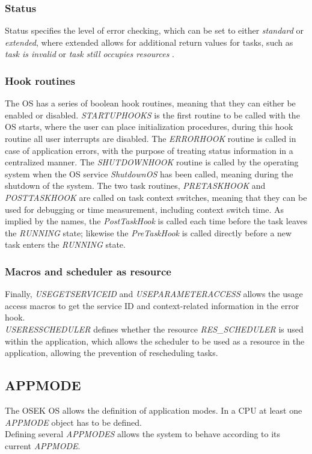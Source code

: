 \subsubsection{Status}
Status specifies the level of error checking, which can be set to either \textit{standard} or \textit{extended}, where extended allows for additional return values for tasks, such as \textit{task is invalid} or \textit{task still occupies resources} \cite{irisa223}.\\

\subsubsection*{Hook routines}
The OS has a series of boolean hook routines, meaning that they can either be enabled or disabled.
\textit{STARTUPHOOKS} is the first routine to be called with the OS starts, where the user can place initialization procedures, during this hook routine all user interrupts are disabled\cite{irisa223}.
The \textit{ERRORHOOK} routine is called in case of application errors, with the purpose of treating status information in a centralized manner.
The \textit{SHUTDOWNHOOK} routine is called by the operating system when the OS service \textit{ShutdownOS} has been called, meaning during the shutdown of the system.
The two task routines, \textit{PRETASKHOOK} and \textit{POSTTASKHOOK} are called on task context switches, meaning that they can be used for debugging or time measurement, including context switch time\cite{irisa223}.
As implied by the names, the \textit{PostTaskHook} is called each time before the task leaves the \textit{RUNNING} state; likewise the \textit{PreTaskHook} is called directly before a new task enters the \textit{RUNNING} state\cite{irisa223}.

\subsubsection*{Macros and scheduler as resource}
Finally, \textit{USEGETSERVICEID} and \textit{USEPARAMETERACCESS} allows the usage access macros to get the service ID and context-related information in the error hook.\\
\textit{USERESSCHEDULER} defines whether the resource \textit{RES\_SCHEDULER} is used within the application, which allows the scheduler to be used as a resource in the application, allowing the prevention of rescheduling tasks\cite{irisa223}.

\subsection{APPMODE}
The OSEK OS allows the definition of application modes.
In a CPU at least one \textit{APPMODE} object has to be defined.\\
Defining several \textit{APPMODES} allows the system to behave according to its current \textit{APPMODE}\cite{irisa25}.

